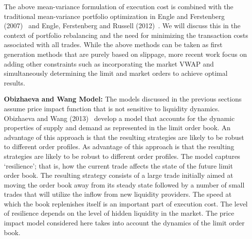 The above mean-variance formulation of execution cost is combined with the traditional mean-variance portfolio optimization in Engle and Ferstenberg (2007)~\cite{engle2007} and Engle, Ferstenberg and Russell (2012)~\cite{engle2012}. We will discuss this in the context of portfolio rebalancing and the need for minimizing the transaction costs associated with all trades. While the above methods can be taken as first generation methods that are purely based on slippage, more recent work focus on adding other constraints such as incorporating the market VWAP and simultaneously determining the limit and market orders to achieve optimal results. \twomedskip


\noindent\textbf{Obizhaeva and Wang Model:} The models discussed in the previous sections assume price impact function that is not sensitive to liquidity dynamics. Obizhaeva and Wang (2013)~\cite{obizhaeva} develop a model that accounts for the dynamic properties of supply and demand as represented in the limit order book. An advantage of this approach is that the resulting strategies are likely to be robust to different order profiles. As advantage of this approach is that the resulting strategies are likely to be robust to different order profiles. The model captures `resilience'; that is, how the current trade affects the state of the future limit order book. The resulting strategy consists of a large trade initially aimed at moving the order book away from its steady state followed by a number of small trades that will utilize the inflow from new liquidity providers. The speed at which the book replenishes itself is an important part of execution cost. The level of resilience depends on the level of hidden liquidity in the market. The price impact model considered here takes into account the dynamics of the limit order book.


